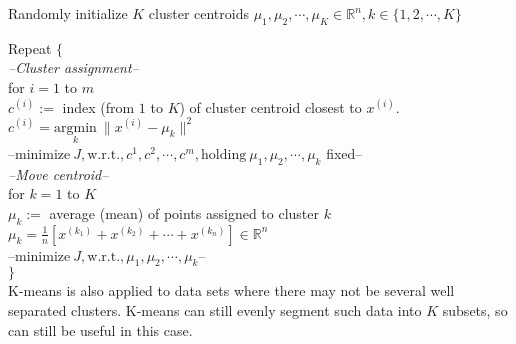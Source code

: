 Randomly initialize $K$ cluster centroids $\mu_1, \mu_2, \cdots, \mu_K \in \mathbb{R}^n, k \in \{1, 2, \cdots, K\}$

Repeat $\{$ \\

\emph{--Cluster assignment--}\\
\indent for $i = 1$ to $m$\\
\indent \indent $c^{(i)} :=$ index (from $1$ to $K$) of cluster centroid closest to $x^{(i)}$.\\
\indent \indent $c^{(i)} = \underset{k}{\mathrm{argmin}} \ \|x^{(i)} - \mu_k\|^2$ \\

\indent --$\text{minimize} ~ J, \text{w.r.t.}, c^{1}, c^{2}, \cdots, c^{m}, \text{holding} ~ \mu_1, \mu_2, \cdots, \mu_k$ fixed--\\

\emph{--Move centroid--}\\
\indent for $k = 1$ to $K$\\
\indent \indent $\mu_k :=$ average (mean) of points assigned to cluster $k$ \\
\indent \indent $\mu_k = \frac{1}{n}[x^{(k_1)} + x^{(k_2)} + \cdots + x^{(k_n)}] \in \mathbb{R}^n$ \\

\indent --$\text{minimize} ~ J, \text{w.r.t.}, \mu_1, \mu_2, \cdots, \mu_k$--\\
$\}$\\

K-means is also applied to data sets where there may not be several well separated clusters. K-means can still evenly segment such data into $K$ subsets, so can still be useful in this case.


